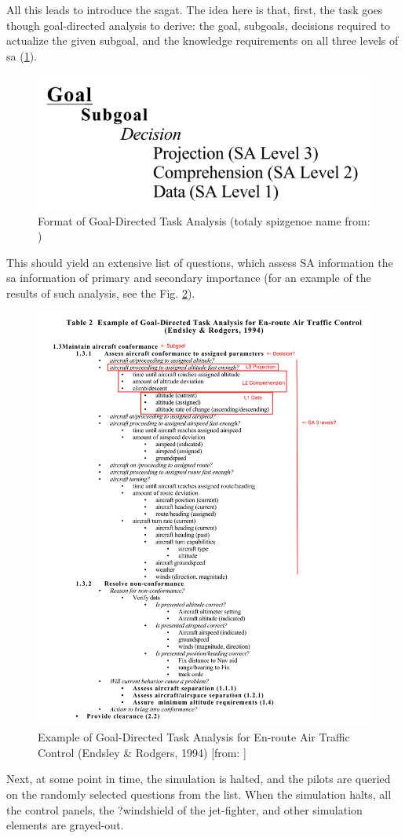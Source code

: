 All this leads \cite{endsley_situation_1988} to introduce the \gls{sagat}. The idea here is that, first, the task goes though goal-directed analysis to derive: the goal, subgoals, decisions required to actualize the given subgoal, and the knowledge requirements on all three levels of \gls{sa} (\ref{fig:sagoalorientedtaskanalysis}). 
\begin{figure}
	\centering
	\includegraphics[width=0.7\linewidth]{figures/placeholders/SA_goal_oriented_task_analysis}
	\caption{Format of Goal-Directed Task Analysis (totaly spizgenoe name from: \cite{endsley_direct_nodate})}
	\label{fig:sagoalorientedtaskanalysis}
\end{figure}
This should yield an extensive list of questions, which assess SA information the \gls{sa} information of primary and secondary importance (for an example of the results of such analysis, see the Fig. \ref{fig:sagoalorientedtaskanalysisresultexample}).
\begin{figure}
	\centering
	\includegraphics[width=0.7\linewidth]{figures/placeholders/SA_goal_oriented_task_analysis_result_example}
	\caption{Example of Goal-Directed Task Analysis for En-route Air Traffic Control (Endsley & Rodgers, 1994) [from: \cite{endsley_direct_nodate}]}
	\label{fig:sagoalorientedtaskanalysisresultexample}
\end{figure}
Next, at some point in time, the simulation is halted, and the pilots are queried on the randomly selected questions from the list. When the simulation halts, all the control panels, the ?windshield of the jet-fighter, and other simulation elements are grayed-out.


